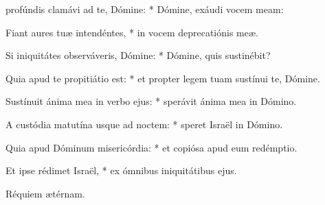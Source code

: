 \begin{psalmus}

     profúndis clamávi ad te, Dómine: * Dómine, exáudi vocem meam:

    Fiant aures tuæ intendéntes, * in vocem deprecatiónis meæ.

    Si iniquitátes observáveris, Dómine: * Dómine, quis sustinébit?

    Quia apud te propitiátio est: * et propter legem tuam sustínui te, Dómine.

    Sustínuit ánima mea in verbo ejus: * sperávit ánima mea in Dómino.

    A custódia matutína usque ad noctem: * speret Israël in Dómino.

    Quia apud Dóminum misericórdia: * et copiósa apud eum redémptio.

    Et ipse rédimet Israël, * ex ómnibus iniquitátibus ejus.

		Réquiem ætérnam.

\end{psalmus}
